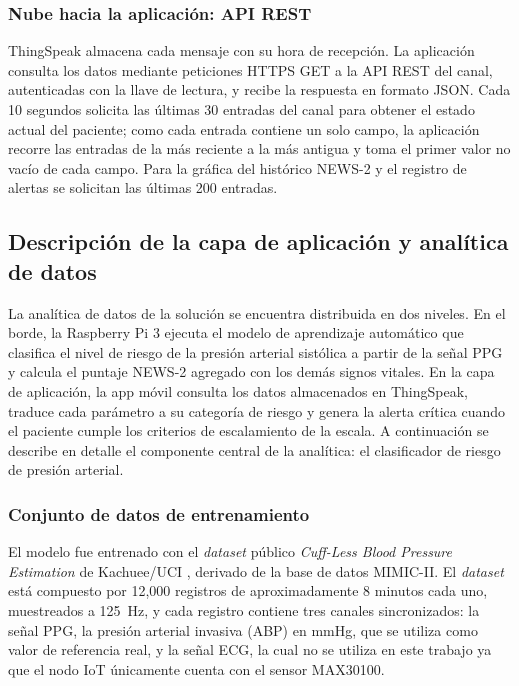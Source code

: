 \documentclass[11pt,a4paper]{article}
\begin{document}
\subsubsection{Nube hacia la aplicación: API REST}

ThingSpeak almacena cada mensaje con su hora de recepción. La aplicación consulta los datos mediante peticiones HTTPS GET a la API REST del canal, autenticadas con la llave de lectura, y recibe la respuesta en formato JSON. Cada 10 segundos solicita las últimas 30 entradas del canal para obtener el estado actual del paciente; como cada entrada contiene un solo campo, la aplicación recorre las entradas de la más reciente a la más antigua y toma el primer valor no vacío de cada campo. Para la gráfica del histórico NEWS-2 y el registro de alertas se solicitan las últimas 200 entradas.

\subsection{Descripción de la capa de aplicación y analítica de datos}

La analítica de datos de la solución se encuentra distribuida en dos niveles. En el borde, la Raspberry Pi 3 ejecuta el modelo de aprendizaje automático que clasifica el nivel de riesgo de la presión arterial sistólica a partir de la señal PPG y calcula el puntaje NEWS-2 agregado con los demás signos vitales. En la capa de aplicación, la app móvil consulta los datos almacenados en ThingSpeak, traduce cada parámetro a su categoría de riesgo y genera la alerta crítica cuando el paciente cumple los criterios de escalamiento de la escala. A continuación se describe en detalle el componente central de la analítica: el clasificador de riesgo de presión arterial.

\subsubsection{Conjunto de datos de entrenamiento}

El modelo fue entrenado con el \textit{dataset} público \textit{Cuff-Less Blood Pressure Estimation} de Kachuee/UCI \cite{ref22}, derivado de la base de datos MIMIC-II. El \textit{dataset} está compuesto por 12,000 registros de aproximadamente 8 minutos cada uno, muestreados a 125~Hz, y cada registro contiene tres canales sincronizados: la señal PPG, la presión arterial invasiva (ABP) en mmHg, que se utiliza como valor de referencia real, y la señal ECG, la cual no se utiliza en este trabajo ya que el nodo IoT únicamente cuenta con el sensor MAX30100.
\end{document}
